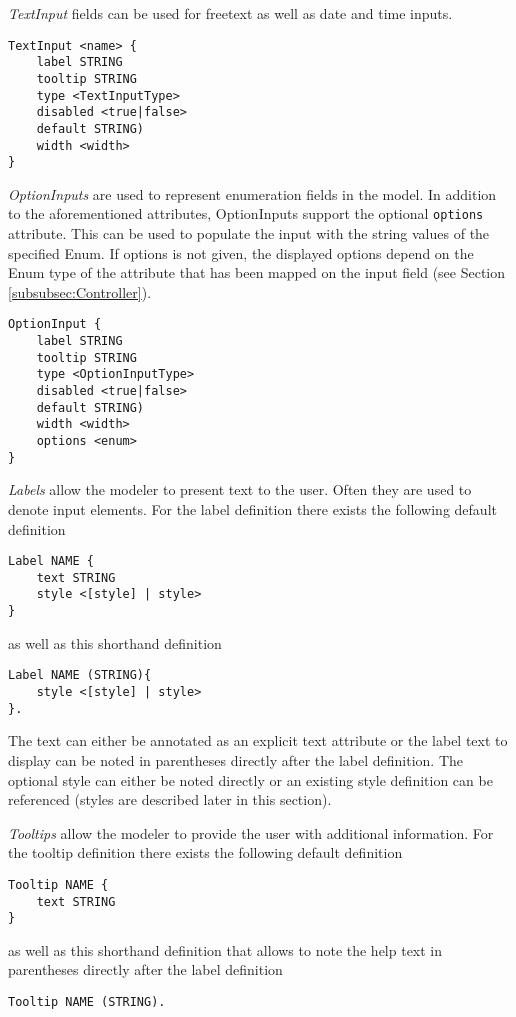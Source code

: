 \textit{TextInput} fields can be used for freetext as well as date and time inputs.
\begin{lstlisting}
TextInput <name> { 
	label STRING
	tooltip STRING
	type <TextInputType>
	disabled <true|false>
	default STRING)
	width <width>
}
\end{lstlisting}

\textit{OptionInputs} are used to represent enumeration fields in the model. In addition to the aforementioned attributes, OptionInputs support the optional \lstinline!options! attribute. This can be used to populate the input with the string values of the specified Enum. If options is not given, the displayed options depend on the Enum type of the attribute that has been mapped on the input field (see Section \ref{subsubsec:Controller}).
\begin{lstlisting}
OptionInput { 
	label STRING
	tooltip STRING
	type <OptionInputType>
	disabled <true|false>
	default STRING)
	width <width>
	options <enum>
}
\end{lstlisting}

\textit{Labels} allow the modeler to present text to the user. Often they are used to denote input elements. For the label definition there exists the following default definition
\begin{lstlisting}
Label NAME {
	text STRING
	style <[style] | style>
}
\end{lstlisting}
as well as this shorthand definition
\begin{lstlisting}
Label NAME (STRING){
	style <[style] | style>
}.
\end{lstlisting}

The text can either be annotated as an explicit text attribute or the label text to display can be noted in parentheses directly after the label definition. The optional style can either be noted directly or an existing style definition can be referenced (styles are described later in this section).

\textit{Tooltips} allow the modeler to provide the user with additional information. For the tooltip definition there exists the following default definition
\begin{lstlisting}
Tooltip NAME {
	text STRING
}
\end{lstlisting}

as well as this shorthand definition that allows to note the help text in parentheses directly after the label definition
\begin{lstlisting}
Tooltip NAME (STRING).
\end{lstlisting}

